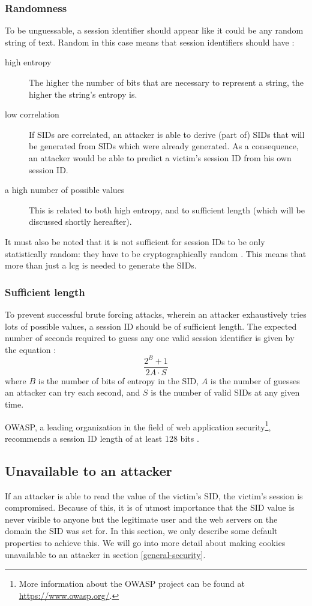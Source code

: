 \subsubsection{Randomness}
To be unguessable, a session identifier should appear like it could be any random string of text. Random in this case means that session identifiers should have \cite{Nikiforakis2010, Farrell2011, rfc4086}:
\begin{description}
	\item[high entropy] The higher the number of bits that are necessary to represent a string, the higher the string's entropy is.
	\item[low correlation] If SIDs are correlated, an attacker is able to derive (part of) SIDs that will be generated from SIDs which were already generated. As a consequence, an attacker would be able to predict a victim's session ID from his own session ID.
	\item[a high number of possible values] This is related to both high entropy, and to sufficient length (which will be discussed shortly hereafter).
\end{description}
It must also be noted that it is not sufficient for session IDs to be only statistically random: they have to be cryptographically random \cite{Fu2001}. This means that more than just a \gls{lcg} \cite{Cools2010}
is needed to generate the SIDs.

\subsubsection{Sufficient length}
To prevent successful brute forcing attacks, wherein an attacker exhaustively tries lots of possible values, a session ID should be of sufficient length. The expected number of seconds required to guess any one valid session identifier is given by the equation \cite{OWASP2009a}:
\[
	\frac{2^B + 1}{2A \cdot S}
\]
where $B$ is the number of bits of entropy in the SID, $A$ is the number of guesses an attacker can try each second, and $S$ is the number of valid SIDs at any given time.

OWASP, a leading organization in the field of web application security\footnote{More information about the OWASP project can be found at \url{https://www.owasp.org/}.}, recommends a session ID length of at least 128 bits \cite{OWASP2009a}.

\subsection{Unavailable to an attacker}
If an attacker is able to read the value of the victim's SID, the victim's session is compromised. Because of this, it is of utmost importance that the SID value is never visible to anyone but the legitimate user and the web servers on the domain the SID was set for. In this section, we only describe some default properties to achieve this. We will go into more detail about making cookies unavailable to an attacker in section \ref{general-security}.

